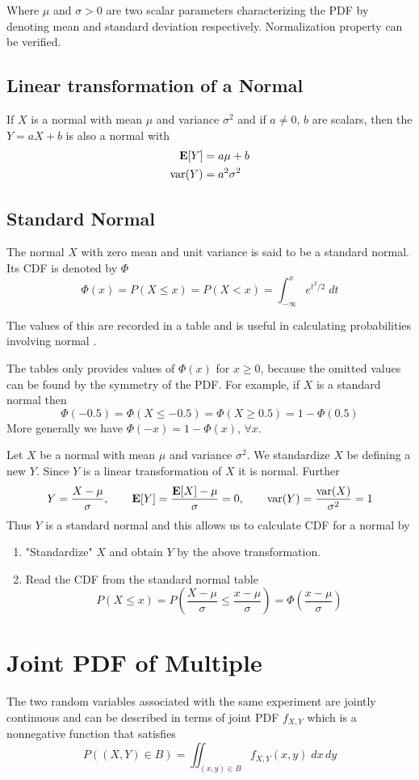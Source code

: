 Where $\mu$ and $\sigma > 0$ are two scalar parameters  characterizing the PDF by denoting mean and standard deviation respectively. Normalization property can be verified.

\subsection{Linear transformation of a Normal \rv}
If $X$ is a normal \rv with mean $\mu$ and variance $\sigma^2$ and if $a \neq 0$, $b$ are scalars, then the \rv $Y=aX+b$ is also a normal \rv with
\begin{align*}
    \operatorname{\textbf{E}}[Y]          &= a\mu + b \\ 
    \text{var} (Y) &= a^2\sigma ^2
\end{align*}

\subsection{Standard Normal \RV}
The normal \rv $X$ with zero mean and unit variance is said to be a standard normal. Its CDF is denoted by $\Phi$
\[\Phi (x)=P(X \le x)=P(X<x)=\int_{-\infty}^{x}e^{t^2/2} \; dt\]

The values of this are recorded in a table and is useful in calculating probabilities involving normal \rv.

The tables only provides values of $\Phi (x)$ for $x\ge 0$, because the omitted values can be found by the symmetry of the PDF. For example, if $X$ is a standard normal then
\[\Phi(-0.5)=\Phi(X\le -0.5)=\Phi(X\ge 0.5)=1-\Phi(0.5)\]
More generally we have $\Phi(-x)=1-\Phi(x)$, $\forall x$.

Let $X$ be a normal \rv with mean $\mu$ and variance $\sigma^2$. We standardize $X$ be defining a new \rv $Y$. Since $Y$ is a linear transformation of $X$ it is normal. Further
\[
    Y=\frac{X-\mu}{\sigma}, \qquad \operatorname{\textbf{E}}[Y] = \frac{\operatorname{\textbf{E}}[X]-\mu}{\sigma}=0, \qquad \text{var}(Y)=\frac{\text{var}(X)}{\sigma^2}=1
\]
Thus $Y$ is a standard normal \rv and this allows us to calculate CDF for a normal \rv by
\begin{enumerate}
    \item "Standardize" $X$ and obtain $Y$ by the above transformation.
    \item Read the CDF from the standard normal table
    \[P(X\le x)=P\left(\frac{X-\mu}{\sigma} \le \frac{x-\mu}{\sigma}\right)=\Phi\left(\frac{x-\mu}{\sigma}\right)\]
\end{enumerate}

\section{Joint PDF of Multiple \RV}
The two random variables associated with the same experiment are jointly continuous and can be described in terms of joint PDF $f_{X,Y}$ which is a nonnegative function that satisfies
\[ \boxed { P((X,Y)\in B) = \iint_{(x,y)\in B}f_{X,Y}(x,y) \; dx \, dy }\]

